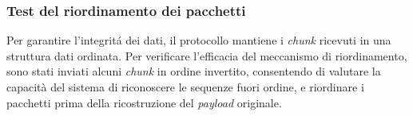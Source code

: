 \documentclass[12pt,a4paper,twoside]{book}
\begin{document}
\subsubsection{Test del riordinamento dei pacchetti}
\begin{table}[H]
    \centering
    \caption{Condizioni del test del meccanismo di riordinamento.}
    \label{tab:T4-conditions}
\end{table}
Per garantire l'integrit\'a dei dati, il protocollo mantiene i \emph{chunk} ricevuti
in una struttura dati ordinata.
Per verificare l'efficacia del meccanismo di riordinamento, sono stati inviati
alcuni \emph{chunk} in ordine invertito, consentendo di valutare la capacità del sistema
di riconoscere le sequenze fuori ordine, e riordinare i pacchetti prima della ricostruzione
del \emph{payload} originale.
\end{document}
